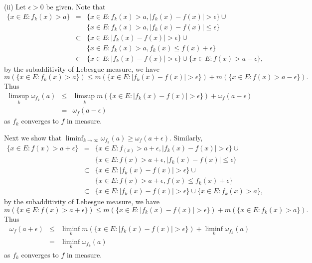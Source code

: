 \documentclass[12pt,a4paper]{ctexart}
\begin{document}
\vspace{6pt}

(ii) Let $\epsilon > 0$ be given. Note that
\begin{eqnarray*}
    \{x \in E: f_{k}(x) > a\}  & = &  \{x \in E: f_{k}(x) > a, |f_k(x) - f(x)| > \epsilon \} \cup \\
    & & \{x \in E: f_{k}(x) > a, |f_k(x) - f(x)| \leq \epsilon\}\\
    & \subset & \{x \in E: |f_k(x) - f(x)| > \epsilon \} \cup \\
    & & \{x \in E: f_{k}(x) > a, f_k(x) \leq f(x) + \epsilon\} \\
    & \subset & \{x \in E: |f_k(x) - f(x)| > \epsilon \} \cup \{x \in E: f(x) > a - \epsilon\},
\end{eqnarray*}
by the subadditivity of Lebesgue measure, we have
$$m(\{x \in E: f_{k}(x) > a \}) \leq m(\{x \in E: |f_k(x) - f(x)| > \epsilon \}) + m(\{x \in E: f(x) > a - \epsilon\}).$$
Thus 
\begin{eqnarray*}
    \limsup_{k} \omega_{f_k}(a)  & \leq &  \limsup_{k} m(\{x \in E: |f_k(x) - f(x)| > \epsilon \}) + \omega_{f} (a- \epsilon) \\
    & = & \omega_{f} (a- \epsilon)
\end{eqnarray*}
as $f_k$ converges to $f$ in measure. 

Next we show that $\liminf_{k \to \infty} \omega_{f_{k}}(a) \geq \omega_{f}(a + \epsilon)$. Similarly,
\begin{eqnarray*}
    \{x \in E: f (x) > a + \epsilon \}  & = &  \{x \in E: f_(x) > a + \epsilon , |f_k(x) - f(x)| > \epsilon \} \cup \\
    & & \{x \in E: f (x) > a +  \epsilon, |f_k(x) - f(x)| \leq \epsilon\}\\
    & \subset & \{x \in E: |f_k(x) - f(x)| > \epsilon \} \cup \\
    & & \{x \in E: f (x) > a + \epsilon, f(x) \leq f_{k}(x) + \epsilon\} \\
    & \subset & \{x \in E: |f_k(x) - f(x)| > \epsilon \} \cup \{x \in E: f_{k}(x) > a \},
\end{eqnarray*}
by the subadditivity of Lebesgue measure, we have
$$m(\{x \in E: f (x) > a + \epsilon \}) \leq m(\{x \in E: |f_k(x) - f(x)| > \epsilon \}) + m(\{x \in E: f_{k}(x) > a \}).$$
Thus 
\begin{eqnarray*}
    \omega_{f}(a + \epsilon)  & \leq &  \liminf_{k} m(\{x \in E: |f_k(x) - f(x)| > \epsilon \}) + \liminf_{k} \omega_{f_k} (a) \\
    & = & \liminf_{k} \omega_{f_k} (a)
\end{eqnarray*}
as $f_k$ converges to $f$ in measure. 
\end{document}
